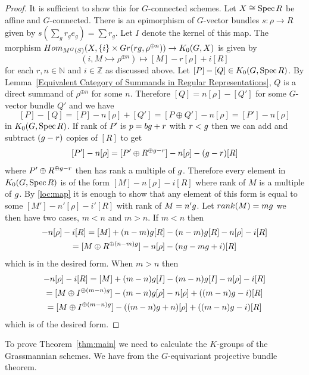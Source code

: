 \documentclass[11pt,twoside]{amsart}
\theoremstyle{definition}
\theoremstyle{remark}
\numberwithin{equation}{section}
\newcommand{\ZZ}{\mathbb{Z}}
\newcommand{\spec}{\mathrm{Spec\hskip .5mm }}
\newcommand{\mono}{\rightarrowtail}
\begin{document}
	\begin{proof}
     It is sufficient to show this for $G$-connected schemes. Let $X\cong \spec R$ be affine and $G$-connected. There is an epimorphism of $G$-vector bundles $s:\rho \to R$ given by $s(\sum_g r_ge_g)=\sum r_g$. Let $I$ denote the kernel of this map. The morphism $Hom_{M^G(S)}(X,\{i\}\times Gr(r\textsl{g},\rho^{\oplus n}))\to K_0(G,X)$ is given by
		\begin{equation}\label{loc:map}
		(i,M\mono \rho^{\oplus n})\mapsto [M]-r[\rho]+i[R] 
		\end{equation}  
		 for each $r,n\in\mathbb{N}$ and $i\in\ZZ$ as discussed above. Let $[P]-[Q]\in K_0(G,\spec R)$. By Lemma~\ref{Equivalent Category of Summands in Regular Representations}, $Q$ is a direct summand of $\rho^{\oplus n}$ for some $n$. Therefore $[Q]=n[\rho]-[Q']$ for some $G$-vector bundle $Q'$ and we have 
		 \[[P]-[Q]=[P]-n[\rho]+[Q']=[P\oplus Q']-n[\rho]=[P']-n[\rho]\]
		 in $K_0(G, \spec R)$. If rank of $P'$ is $p=b\textsl{g}+r$ with $r<\textsl{g}$ then we can add and subtract $(\textsl{g}-r)$ copies of $[R]$ to get 
		 \[ [P']-n[\rho]=[P'\oplus R^{\oplus \textsl{g}-r}]-n[\rho]-(\textsl{g}-r)[R] \]
		 where $P'\oplus R^{\oplus \textsl{g}-r}$ then has rank a multiple of $\textsl{g}$. Therefore every element in $K_0(G,\spec R)$ is of the form $[M]-n[\rho]-i[R]$ where rank of $M$ is a multiple of $\textsl{g}$. By \ref{loc:map} it is enough to show that any element of this form is equal to some $[M']-n'[\rho]-i'[R]$ with rank of $M=n'\textsl{g}$. Let $rank(M)=m\textsl{g}$ we then have two cases, $m<n$ and $m>n$. If $m<n$ then 
		 \begin{multline*}
		 [M]-n[\rho]-i[R]=[M]+(n-m)\textsl{g}[R]-(n-m)\textsl{g}[R]-n[\rho]-i[R]\\=[M\oplus R^{\oplus (n-m)\textsl{g}}]-n[\rho]-(n\textsl{g}-m\textsl{g}+i)[R]
		 \end{multline*}
		 which is in the desired form. When $m>n$ then 
		 \begin{multline*}
		 	[M]-n[\rho]-i[R]=[M]+(m-n)\textsl{g}[I]-(m-n)\textsl{g}[I]-n[\rho]-i[R]\\
		 	=[M\oplus I^{\oplus (m-n)\textsl{g}}]-(m-n)\textsl{g}[\rho]-n[\rho]+((m-n)\textsl{g}-i)[R]\\=[M\oplus I^{\oplus (m-n)\textsl{g}}]-((m-n)\textsl{g}+n)[\rho]+((m-n)\textsl{g}-i)[R]
		 \end{multline*}  
		 which is of the desired form.
	\end{proof}
	To prove Theorem~\ref{thm:main} we need to calculate the $K$-groups of the Grassmannian schemes. We have from \cite[Theorem~3.1]{T87} the $G$-equivariant projective bundle theorem. 
\end{document}
